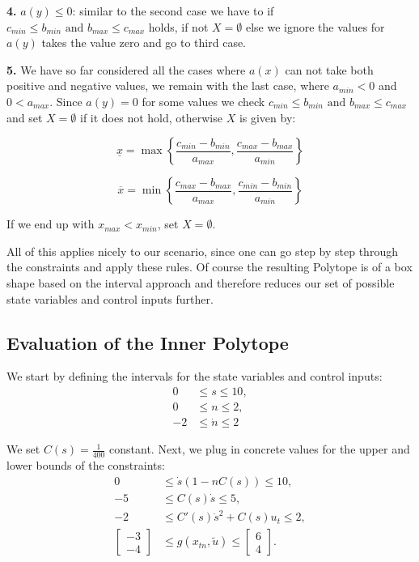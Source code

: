 \textbf{4.}
$a(y) \leq 0$:
similar to the second case we have to if $c_{min} \leq b_{min} \text{ and } b_{max} \leq c_{max}$ holds, if not $X=\emptyset$ else we ignore the values for $a(y)$ takes the value zero and go to third case.

\textbf{5.}
We have so far considered all the cases where $a(x)$ can not take both positive and negative values, we remain with the last case, where $a_{min}<0$
and $0<a_{max}$.
Since $a(y)=0$ for some values we check $c_{min} \leq b_{min} \text{ and } b_{max} \leq c_{max}$ and set $X=\emptyset$ if it does not hold, otherwise
$X$ is given by:

\[ \underline{x} = \max \left\{ \frac{c_{min} - b_{min}}{a_{max}}, \frac{c_{max} - b_{max}}{a_{min}} \right\} \]

\[ \overline{x} = \min \left\{ \frac{c_{max} - b_{max}}{a_{max}}, \frac{c_{min} - b_{min}}{a_{min}} \right\} \]

If we end up with $x_{max} < x_{min}$, set $X=\emptyset$.

All of this applies nicely to our scenario, since one can go step by step through the constraints and apply these rules.
Of course the resulting Polytope is of a box shape based on the interval approach and therefore reduces our set of possible state variables and
control inputs further.

\subsection{Evaluation of the Inner Polytope}

We start by defining the intervals for the state variables and control inputs:
\begin{align*}
	0  & \leq s \leq 10,     \\
	0  & \leq n \leq 2,      \\
	-2 & \leq \dot{n} \leq 2
\end{align*}

We set $C(s) = \frac{1}{400}$ constant.
Next, we plug in concrete values for the upper and lower bounds of the constraints:
\begin{align*}
	0               & \leq \dot{s}(1 - nC(s)) \leq 10,            \\
	-5              & \leq C(s) \dot{s} \leq 5,                   \\
	-2              & \leq C'(s) \dot{s}^2 + C(s) u_t \leq 2,     \\
	\begin{bmatrix}
		-3 \\ -4
	\end{bmatrix} & \leq g(x_{tn}, \tilde{u}) \leq \begin{bmatrix}
		                                               6 \\ 4
	                                               \end{bmatrix}.
\end{align*}

